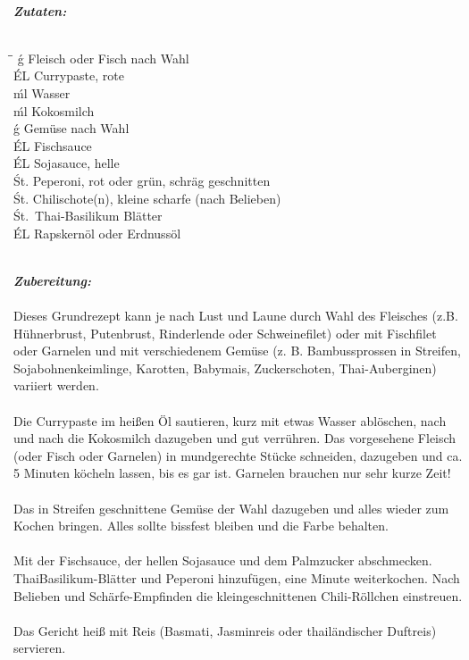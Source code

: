 \documentclass{scrartcl}
\begin{document}
{\\}\par\bigskip
{\itshape {\bfseries Zutaten:}}\\ \\
\begin{tabbing}

\hspace{1cm}\=\hspace{1cm}\=\kill
{}\'g\> Fleisch oder Fisch nach Wahl\\
\'EL \> Currypaste, rote\\
\'ml \> Wasser\\
\'ml \> Kokosmilch\\
\'g\> Gemüse nach Wahl\\
 \'EL \> Fischsauce\\
 \'EL \> Sojasauce, helle\\
 \'St.\> Peperoni, rot oder grün, schräg geschnitten\\
 \'St.\> Chilischote(n), kleine scharfe (nach Belieben)\\
 \'St.\ Thai-Basilikum Blätter\\
 \'EL \> Rapskernöl oder Erdnussöl\\ \\
\end{tabbing}

{\itshape {\bfseries Zubereitung:}}\\ \\
Dieses Grundrezept kann je nach Lust und Laune durch Wahl des Fleisches (z.B. Hühnerbrust,
Putenbrust, Rinderlende oder Schweinefilet) oder mit Fischfilet oder Garnelen
und mit verschiedenem Gemüse (z. B. Bambussprossen in Streifen, Sojabohnenkeimlinge,
Karotten, Babymais, Zuckerschoten, Thai-Auberginen) variiert werden.\\ \\
Die Currypaste im heißen Öl sautieren, kurz mit etwas Wasser ablöschen, nach und nach
die Kokosmilch dazugeben und gut verrühren. Das vorgesehene Fleisch (oder Fisch oder
Garnelen) in mundgerechte Stücke schneiden, dazugeben und ca. 5 Minuten köcheln
lassen, bis es gar ist. Garnelen brauchen nur sehr kurze Zeit!\\ \\
Das in Streifen geschnittene Gemüse der Wahl dazugeben und alles wieder zum Kochen
bringen. Alles sollte bissfest bleiben und die Farbe behalten.\\ \\
Mit der Fischsauce, der hellen Sojasauce und dem Palmzucker abschmecken. ThaiBasilikum-Blätter
und Peperoni hinzufügen, eine Minute weiterkochen. Nach Belieben
und Schärfe-Empfinden die kleingeschnittenen Chili-Röllchen einstreuen.\\ \\
Das Gericht heiß mit Reis (Basmati, Jasminreis oder thailändischer Duftreis) servieren.
\end{document}

